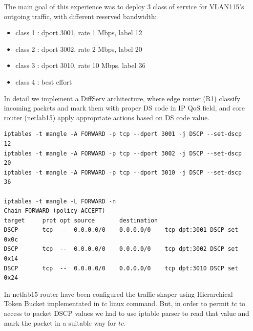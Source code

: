 \documentclass{llncs}
\begin{document}
The main goal of this experience was to deploy 3 class of service for VLAN115's outgoing traffic, with different reserved bandwidth:
\begin{itemize}
\item class 1 :  dport 3001, rate 1 Mbps,  label 12
\item class 2 :  dport 3002, rate 2 Mbps,  label 20 
\item class 3 :  dport 3010, rate 10 Mbps,  label 36 
\item class 4 :  best effort
\end{itemize}

In detail we implement a DiffServ architecture, where edge router (R1) classify incoming packets and mark them with proper DS code in IP QoS field, and core router (netlab15) apply appropriate actions based on DS code value.\\


\lstset{language=sh, caption=R1 packet classification using iptables mangle, basicstyle=\ttfamily\scriptsize , breaklines=true}
\begin{lstlisting}
iptables -t mangle -A FORWARD -p tcp --dport 3001 -j DSCP --set-dscp 12
iptables -t mangle -A FORWARD -p tcp --dport 3002 -j DSCP --set-dscp 20
iptables -t mangle -A FORWARD -p tcp --dport 3010 -j DSCP --set-dscp 36

iptables -t mangle -L FORWARD -n
Chain FORWARD (policy ACCEPT)
target     prot opt source       destination         
DSCP       tcp  --  0.0.0.0/0    0.0.0.0/0    tcp dpt:3001 DSCP set 0x0c 
DSCP       tcp  --  0.0.0.0/0    0.0.0.0/0    tcp dpt:3002 DSCP set 0x14 
DSCP       tcp  --  0.0.0.0/0    0.0.0.0/0    tcp dpt:3010 DSCP set 0x24 
\end{lstlisting}

In netlab15 router have been configured the traffic shaper using Hierarchical Token Bucket implementated in $tc$ linux command. But, in order to permit $tc$ to access to packet DSCP values  we had to use iptable parser to read that value and mark the packet in a suitable way for $tc$.
\end{document}
